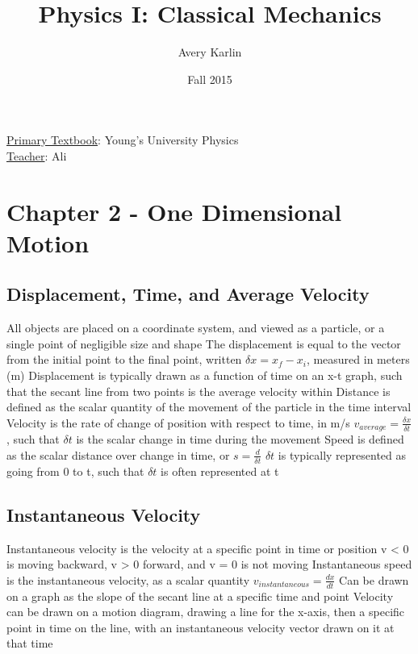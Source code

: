 \documentclass[11 pt, twoside]{article}
\newenvironment{outline*}
{
	\begin{outline}[enumerate]
	}
	{\end{outline}
}
\begin{document}
\title{Physics I: Classical Mechanics}
\author{Avery Karlin}
\date{Fall 2015}
\newcommand{\textbook}{Young's University Physics}
\newcommand{\teacher}{Ali}

\maketitle
\newpage
\hypertarget{content}{\tableofcontents}
\vspace{11pt}
\noindent
\underline{Primary Textbook}: \textbook\\
\underline{Teacher}: \teacher
\newpage

\section{Chapter 2 - One Dimensional Motion}
\subsection{Displacement, Time, and Average Velocity}
\begin{outline*}
\1 All objects are placed on a coordinate system, and viewed as a particle, or a single point of negligible size and shape
\1 The displacement is equal to the vector from the initial point to the final point, written $\delta x = x_f - x_i$, measured in meters (m)
\2 Displacement is typically drawn as a function of time on an x-t graph, such that the secant line from two points is the average velocity within
\2 Distance is defined as the scalar quantity of the movement of the particle in the time interval
\1 Velocity is the rate of change of position with respect to time, in m/s
\1 $v_{average} = \frac{\delta x}{\delta t}$, such that $\delta t$ is the scalar change in time during the movement
\2 Speed is defined as the scalar distance over change in time, or $s = \frac{d}{\delta t}$
\2 $\delta t$ is typically represented as going from 0 to t, such that $\delta t$ is often represented at t
\end{outline*}
\subsection{Instantaneous Velocity}
\begin{outline*}
\1 Instantaneous velocity is the velocity at a specific point in time or position
\2 v < 0 is moving backward, v > 0 forward, and v = 0 is not moving
\2 Instantaneous speed is the instantaneous velocity, as a scalar quantity
\1 $v_{instantaneous} = \frac{dx}{dt}$
\2 Can be drawn on a graph as the slope of the secant line at a specific time and point
\1 Velocity can be drawn on a motion diagram, drawing a line for the x-axis, then a specific point in time on the line, with an instantaneous velocity vector drawn on it at that time
\end{outline*}
\end{document}
